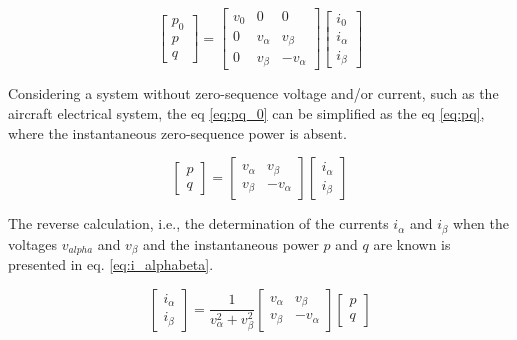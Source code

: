 \begin{equation}
\begin{bmatrix}
p_0\\
p\\
q
\end{bmatrix}=
\begin{bmatrix}
v_0		&	0			&	0\\
0		&	v_{\alpha}	&	v_{\beta}\\
0		&	v_{\beta}	&	-v_{\alpha}
\end{bmatrix}
\begin{bmatrix}
i_{0}\\
i_{\alpha}\\
i_{\beta}
\end{bmatrix}
\label{eq:pq_0}
\end{equation} 

Considering a system without zero-sequence voltage and/or current, such as the aircraft electrical system, the eq \ref{eq:pq_0} can be simplified as the eq \ref{eq:pq}, where the instantaneous zero-sequence power is absent.

\begin{equation}
\begin{bmatrix}
p\\
q
\end{bmatrix}=
\begin{bmatrix}
v_{\alpha}	&	v_{\beta}\\
v_{\beta}	&	-v_{\alpha}
\end{bmatrix}
\begin{bmatrix}
i_{\alpha}\\
i_{\beta}
\end{bmatrix}
\label{eq:pq}
\end{equation} 

The reverse calculation, i.e., the determination of the currents $i_{\alpha}$ and $i_{\beta}$ when the voltages $v_{alpha}$ and $v_{\beta}$ and the instantaneous power $p$ and $q$ are known is presented in eq. \ref{eq:i_alphabeta}.

\begin{equation}
\begin{bmatrix}
i_{\alpha}\\
i_{\beta}
\end{bmatrix}=
\dfrac{1}{v_{\alpha}^2+v_{\beta}^2}
\begin{bmatrix}
v_{\alpha}	&	v_{\beta}\\
v_{\beta}	&	-v_{\alpha}
\end{bmatrix}
\begin{bmatrix}
p\\
q
\end{bmatrix}
\label{eq:i_alphabeta}
\end{equation}

